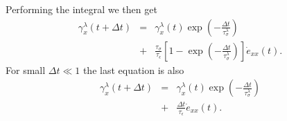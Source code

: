 \documentclass[11pt]{article}
\begin{document}
Performing the integral we then get
\begin{eqnarray*}
\gamma^{\lambda}_x(t+\Delta t) 
   & = & \gamma^{\lambda}_x (t)\exp(-\frac{\Delta t}{\tau^{\lambda}_{\sigma}}) \\
   & + & \frac{\tau_{\sigma}}{\tau_{\epsilon}}
         \left[1-\exp(-\frac{\Delta t}{\tau^{\lambda}_{\sigma}})\right]
         \dot{e}_{xx}(t).
\end{eqnarray*}
%
For small $\Delta t \ll 1$ the last equation is also
\begin{eqnarray*}
\gamma^{\lambda}_x(t+\Delta t) 
   & = & \gamma^{\lambda}_x (t)\exp(-\frac{\Delta t}{\tau^{\lambda}_{\sigma}}) \\
   & + & \frac{\Delta t}{\tau_{\epsilon}}\dot{e}_{xx}(t).
\end{eqnarray*}
\end{document}

